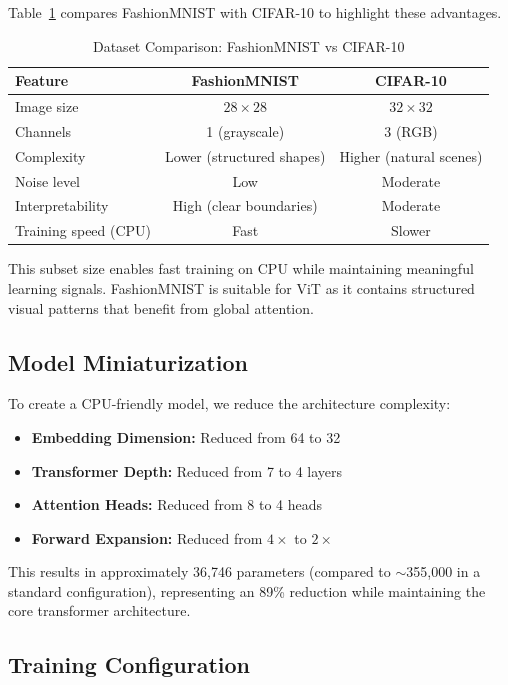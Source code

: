 \documentclass{article}
\begin{document}
Table~\ref{tab:dataset_comparison} compares FashionMNIST with CIFAR-10 to highlight these advantages.

\begin{table}[H]
\centering
\caption{Dataset Comparison: FashionMNIST vs CIFAR-10}
\label{tab:dataset_comparison}
\begin{tabular}{lcc}
\toprule
\textbf{Feature} & \textbf{FashionMNIST} & \textbf{CIFAR-10} \\
\midrule
Image size & $28 \times 28$ & $32 \times 32$ \\
Channels & 1 (grayscale) & 3 (RGB) \\
Complexity & Lower (structured shapes) & Higher (natural scenes) \\
Noise level & Low & Moderate \\
Interpretability & High (clear boundaries) & Moderate \\
Training speed (CPU) & Fast & Slower \\
\bottomrule
\end{tabular}
\end{table}

This subset size enables fast training on CPU while maintaining meaningful learning signals. FashionMNIST is suitable for ViT as it contains structured visual patterns that benefit from global attention.

\subsection{Model Miniaturization}

To create a CPU-friendly model, we reduce the architecture complexity:

\begin{itemize}
    \item \textbf{Embedding Dimension:} Reduced from 64 to 32
    \item \textbf{Transformer Depth:} Reduced from 7 to 4 layers
    \item \textbf{Attention Heads:} Reduced from 8 to 4 heads
    \item \textbf{Forward Expansion:} Reduced from $4\times$ to $2\times$
\end{itemize}

This results in approximately 36,746 parameters (compared to $\sim$355,000 in a standard configuration), representing an 89\% reduction while maintaining the core transformer architecture.

\subsection{Training Configuration}
\end{document}
